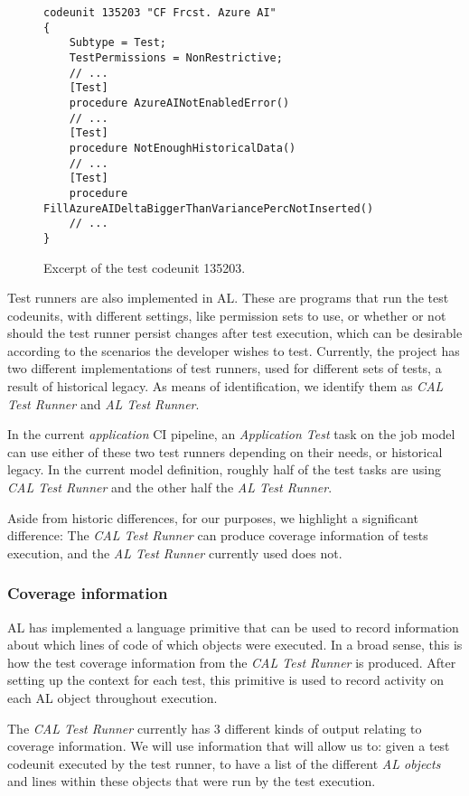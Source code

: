 \begin{figure}
    \begin{Verbatim}[fontsize=\tiny]
codeunit 135203 "CF Frcst. Azure AI"
{
    Subtype = Test;
    TestPermissions = NonRestrictive;
    // ...
    [Test]
    procedure AzureAINotEnabledError()
    // ...
    [Test]
    procedure NotEnoughHistoricalData()
    // ...
    [Test]
    procedure FillAzureAIDeltaBiggerThanVariancePercNotInserted()
    // ...
}
    \end{Verbatim}
    \caption{Excerpt of the test codeunit 135203.}
    \label{fig:bg-bc-test-codeunit}
\end{figure}

Test runners are also implemented in AL. These are programs that run the test codeunits, with different
settings, like permission sets to use, or whether or not should the test runner persist changes after 
test execution, which can be desirable according to the scenarios the developer wishes to test. Currently, 
the project has two different implementations of test runners, used for different
sets of tests, a result of historical legacy. As means of identification, we identify them 
as \emph{CAL Test Runner} and \emph{AL Test Runner}.

In the current \emph{application} CI pipeline, an \emph{Application Test} task on the job model can use either of these 
two test runners depending on their needs, or historical legacy. In the current model definition,
roughly half of the test tasks are using \emph{CAL Test Runner} and the other half the \emph{AL Test Runner}.

Aside from historic differences, for our purposes, we highlight a significant
difference: The \emph{CAL Test Runner} can produce coverage information of tests execution, and the \emph{AL Test Runner}
currently used does not.

\subsubsection{Coverage information}\label{s:bg-bc-coverage}
AL has implemented a language primitive that can be used to record information about which lines 
of code of which objects were executed. In a broad sense, this is how the test coverage information from 
the \emph{CAL Test Runner} is produced. After setting up the context for each test, this primitive is used
to record activity on each AL object throughout execution.

The \emph{CAL Test Runner} currently has 3 different kinds of output relating to coverage information.
We will use information that will allow us to: given a test codeunit executed by the test runner, 
to have a list of the different \emph{AL objects} and lines within these objects that were run by
the test execution.

